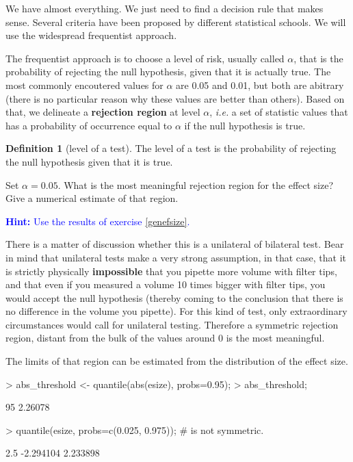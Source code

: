 \documentclass[a4paper]{article}
\theoremstyle{definition}
\newtheorem{definition}{Definition}
\begin{document}
We have almost everything. We just need to find a decision rule that makes
sense. Several criteria have been proposed by different statistical schools.
We will use the widespread frequentist approach.

The frequentist approach is to choose a level of risk, usually called
$\alpha$, that is the probability of rejecting the null hypothesis,
given that it is actually true. The most commonly encoutered values for
$\alpha$ are 0.05 and 0.01, but both are abitrary (there is no particular
reason why these values are better than others). Based on that, we
delineate a \textbf{rejection region} at level $\alpha$, \textit{i.e.}
a set of statistic values that has a probability of occurrence equal
to $\alpha$ if the null hypothesis is true.

\begin{definition}[level of a test]
The level of a test is the probability of rejecting the null
hypothesis given that it is true.
\end{definition}

\begin{Exercise}
\label{thresh}
Set $\alpha = 0.05$. What is the most meaningful rejection region for
the effect size? Give a numerical estimate of that region.
\par\noindent\textcolor{Blue}{\textbf{Hint:} Use the results of
exercise \ref{genefsize}.}
\end{Exercise}
\begin{Answer}
There is a matter of discussion whether this is a unilateral of bilateral
test. Bear in mind that unilateral tests make a very strong assumption,
in that case, that it is strictly physically \textbf{impossible} that
you pipette more volume with filter tips, and that even if you measured
a volume 10 times bigger with filter tips, you would accept the null
hypothesis (thereby coming to the conclusion that there is no difference
in the volume you pipette). For this kind of test, only extraordinary
circumstances would call for unilateral testing. Therefore a symmetric
rejection region, distant from the bulk of the values around 0
is the most meaningful.
\par
The limits of that region can be estimated from the distribution
of the effect size.
\begin{Schunk}
\begin{Sinput}
> abs_threshold <- quantile(abs(esize), probs=0.95);
> abs_threshold;
\end{Sinput}
\begin{Soutput}
    95%
2.26078 
\end{Soutput}
\begin{Sinput}
> quantile(esize, probs=c(0.025, 0.975)); # is not symmetric.
\end{Sinput}
\begin{Soutput}
     2.5%
-2.294104  2.233898 
\end{Soutput}
\end{Schunk}
\end{Answer}
\end{document}

